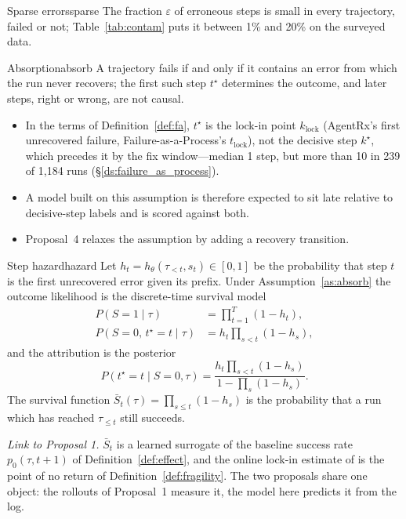 \begin{assumption}{Sparse errors}{sparse}
The fraction $\varepsilon$ of erroneous steps is small in every trajectory, failed or not; Table~\ref{tab:contam} puts it between 1\% and 20\% on the surveyed data.
\end{assumption}

\begin{assumption}{Absorption}{absorb}
A trajectory fails if and only if it contains an error from which the run never recovers; the first such step $t^\star$ determines the outcome, and later steps, right or wrong, are not causal.
\begin{itemize}[leftmargin=1.1em]
\item In the terms of Definition~\ref{def:fa}, $t^\star$ is the lock-in point $k_{\mathrm{lock}}$ (AgentRx's first unrecovered failure, Failure-as-a-Process's $t_{\mathrm{lock}}$), not the decisive step $k^\star$, which precedes it by the fix window---median 1 step, but more than 10 in 239 of 1,184 runs (\S\ref{ds:failure_as_process}).
\item A model built on this assumption is therefore expected to sit late relative to decisive-step labels and is scored against both.
\item Proposal~4 relaxes the assumption by adding a recovery transition.
\end{itemize}
\end{assumption}

\begin{definition}{Step hazard}{hazard}
Let $h_t=h_\theta(\tau_{<t},s_t)\in[0,1]$ be the probability that step $t$ is the first unrecovered error given its prefix. Under Assumption~\ref{as:absorb} the outcome likelihood is the discrete-time survival model
\begin{align*}
P(S{=}1\mid\tau)&=\textstyle\prod_{t=1}^{T}(1-h_t),\\
P(S{=}0,\,t^\star{=}t\mid\tau)&=h_t\textstyle\prod_{s<t}(1-h_s),
\end{align*}
and the attribution is the posterior
\[P(t^\star{=}t\mid S{=}0,\tau)=\frac{h_t\prod_{s<t}(1-h_s)}{1-\prod_{s}(1-h_s)}.\]
The survival function $\bar S_t(\tau)=\prod_{s\le t}(1-h_s)$ is the probability that a run which has reached $\tau_{\le t}$ still succeeds.
\end{definition}

\emph{Link to Proposal 1.} $\bar S_t$ is a learned surrogate of the baseline success rate $p_0(\tau,t{+}1)$ of Definition~\ref{def:effect}, and the online lock-in estimate of  is the point of no return of Definition~\ref{def:fragility}. The two proposals share one object: the rollouts of Proposal~1 measure it, the model here predicts it from the log.

